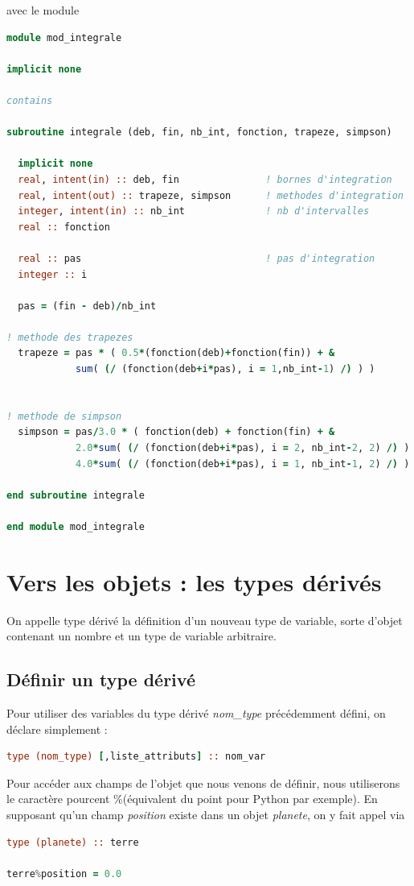 \documentclass[a4paper,twoside]{article}
\begin{document}
avec le module
\begin{lstlisting}[language=Fortran]
module mod_integrale

implicit none

contains

subroutine integrale (deb, fin, nb_int, fonction, trapeze, simpson)

  implicit none
  real, intent(in) :: deb, fin               ! bornes d'integration
  real, intent(out) :: trapeze, simpson      ! methodes d'integration
  integer, intent(in) :: nb_int              ! nb d'intervalles    
  real :: fonction

  real :: pas                                ! pas d'integration
  integer :: i

  pas = (fin - deb)/nb_int

! methode des trapezes
  trapeze = pas * ( 0.5*(fonction(deb)+fonction(fin)) + &
            sum( (/ (fonction(deb+i*pas), i = 1,nb_int-1) /) ) ) 


! methode de simpson
  simpson = pas/3.0 * ( fonction(deb) + fonction(fin) + &
            2.0*sum( (/ (fonction(deb+i*pas), i = 2, nb_int-2, 2) /) ) + &
            4.0*sum( (/ (fonction(deb+i*pas), i = 1, nb_int-1, 2) /) ) )

end subroutine integrale

end module mod_integrale
\end{lstlisting}



\section{Vers les objets : les types dérivés}
On appelle type dérivé la définition d'un nouveau type de variable, sorte d'objet contenant un nombre et un type de variable arbitraire. 

\subsection{Définir un type dérivé}

Pour utiliser des variables du type dérivé \textit{nom\_type} précédemment défini, on déclare simplement :
\begin{lstlisting}[language=Fortran]
type (nom_type) [,liste_attributs] :: nom_var
\end{lstlisting}

\begin{remarque}
Pour accéder aux champs de l'objet que nous venons de définir, nous utiliserons le caractère pourcent \og \%\fg (équivalent du point pour Python par exemple). En supposant qu'un champ \textit{position} existe dans un objet \textit{planete}, on y fait appel via
\begin{lstlisting}[language=Fortran]
type (planete) :: terre

terre%position = 0.0
\end{lstlisting}
\end{remarque}
\end{document}
